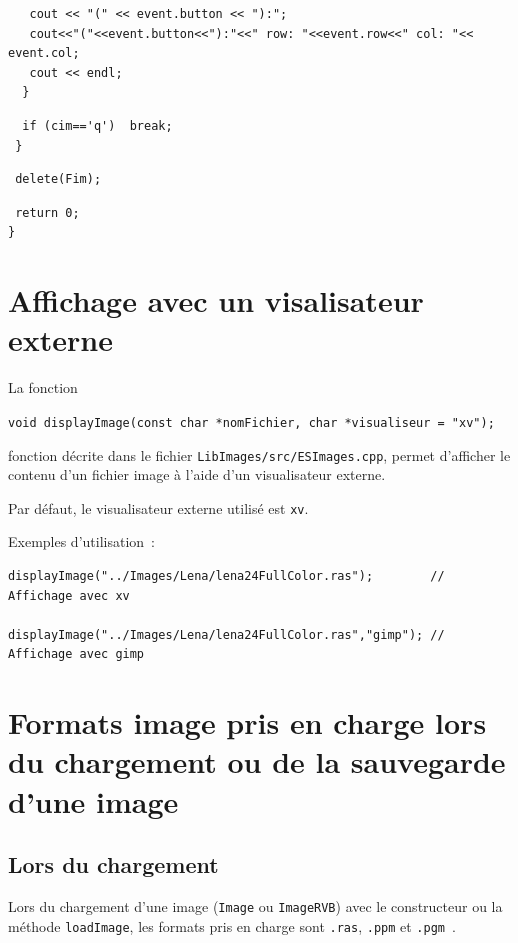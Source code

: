 \documentclass[12pt]{article}
\begin{document}
\begin{footnotesize}
\begin{verbatim}
   cout << "(" << event.button << "):";
   cout<<"("<<event.button<<"):"<<" row: "<<event.row<<" col: "<< event.col;
   cout << endl;
  }
\end{verbatim}
\begin{verbatim}
  if (cim=='q')  break;
 }
\end{verbatim}
\begin{verbatim}
 delete(Fim);
\end{verbatim}
\begin{verbatim}
 return 0;
}
\end{verbatim}
\end{footnotesize}

\section{Affichage avec un visalisateur externe}

La fonction
\begin{center}
{\tt void displayImage(const char *nomFichier, char *visualiseur = "xv");}
\end{center}
fonction d\'ecrite dans le fichier {\tt LibImages/src/ESImages.cpp},
permet d'afficher le contenu d'un fichier image \`a l'aide d'un
visualisateur externe.

Par d\'efaut, le visualisateur externe utilis\'e est
{\tt xv}.

\vspace{0.3cm}

Exemples d'utilisation~:

\begin{footnotesize}
\begin{verbatim}
displayImage("../Images/Lena/lena24FullColor.ras");        // Affichage avec xv

displayImage("../Images/Lena/lena24FullColor.ras","gimp"); // Affichage avec gimp
\end{verbatim}
\end{footnotesize}

\section{Formats image pris en charge lors
du chargement ou de la sauvegarde d'une image}

\subsection{Lors du chargement}

Lors du chargement d'une image ({\tt Image} ou {\tt ImageRVB})
avec le constructeur ou la m\'ethode {\tt loadImage},
les formats pris en charge sont {\tt .ras}, {\tt .ppm} et {\tt .pgm}~.
\end{document}
